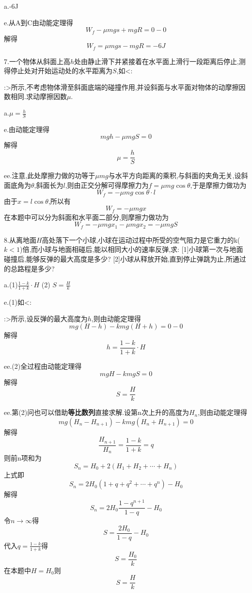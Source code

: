 \begin{calculate}
a.-6J

e.从A到C由动能定理得
\[
  W_f-\mu mgs+mgR=0-0
\]
解得
\[
  W_f=\mu mgs-mgR=-6J
\]

7.一个物体从斜面上高$h$处由静止滑下并紧接着在水平面上滑行一段距离后停止,测得停止处对开始运动处的水平距离为$S$,如<:
:>所示,不考虑物体滑至斜面底端的碰撞作用,并设斜面与水平面对物体的动摩擦因数相同.求动摩擦因数$\mu$.

a.$\mu=\frac{h}{S}$

e.由动能定理得
\[
  mgh-\mu mgS=0
\]
解得
\[
  \mu=\frac{h}{S}
\]

ee.注意,此处摩擦力做的功等于$\mu mg$与水平方向距离的乘积,与斜面的夹角无关,设斜面底角为$\theta$,斜面长为$l$,则由正交分解可得摩擦力为$f=\mu mg\cos\theta$,于是摩擦力做功为
\[
  W_f=-\mu mg\cos\theta \cdot l
\]
由于$x=l\cos\theta$,所以有
\[
  W_f=-\mu mgx
\]
在本题中可以分为斜面和水平面二部分,则摩擦力做功为
\[
  W_f=-\mu mg x_1-\mu mgx_2=-\mu mgS
\]

8.从离地面$H$高处落下一个小球,小球在运动过程中所受的空气阻力是它重力的k($k<1$)倍,而小球与地面相碰后,能以相同大小的速率反弹,求:
[1]小球第一次与地面碰撞后,能够反弹的最大高度是多少?
[2]小球从释放开始,直到停止弹跳为止,所通过的总路程是多少?

a.(1)$\frac{1-k}{1+k}\cdot H$ \qquad (2) $S=\frac{H}{k}$

e.(1)如<:
:>所示,设反弹的最大高度为$h$,则由动能定理得
\[
  mg(H-h)-kmg(H+h)=0-0
\]
解得
\[
  h=\frac{1-k}{1+k}\cdot H
\]

ee.(2)全过程由动能定理得
\[
  mgH-kmgS=0
\]
解得
\[
  S=\frac{H}{k}
\]

ee.第(2)问也可以借助{\bf 等比数列}直接求解.设第n次上升的高度为$H_n$,则由动能定理得
\[
  mg(H_n-H_{n+1})-kmg(H_n+H_{n+1})=0
\]
解得
\[
  \frac{H_{n+1}}{H_n}=\frac{1-k}{1+k}=q
\]
则前n项和为
\[
  S_n=H_0+2(H_1+H_2+\cdots +H_n)
\]
上式即
\[
  S_n=2H_0(1+q+q^2+\cdots+q^n)-H_0
\]
解得
\[
  S_n=2H_0\frac{1-q^{n+1}}{1-q}-H_0
\]
令$n\to\infty$得
\[
  S=\frac{2H_0}{1-q}-H_0
\]
代入$q=\frac{1-k}{1+k}$得
\[
  S=\frac{H_0}{k}
\]
在本题中$H=H_0$则
\[
  S=\frac{H}{k}
\]

\end{calculate}
